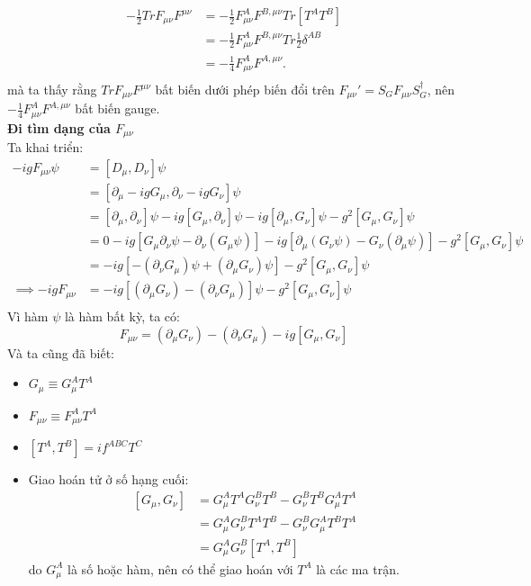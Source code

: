 \documentclass[14Pt]{report}
\begin{document}
	\begin{equation}
		\begin{split}
			-\frac{1}{2}TrF_{\mu\nu}F^{\mu\nu}	
			&=-\frac{1}{2}F_{\mu\nu}^AF^{B,\mu\nu}Tr\left[T^AT^B\right]\\
			&=-\frac{1}{2}F_{\mu\nu}^AF^{B,\mu\nu}Tr\frac{1}{2}\delta^{AB}\\
			&=-\frac{1}{4}F_{\mu\nu}^AF^{A,\mu\nu}.\\
		\end{split}
	\end{equation}
	mà ta thấy rằng $TrF_{\mu\nu}F^{\mu\nu}$ bất biến dưới phép biến đổi trên $F_{\mu\nu}'=S_GF_{\mu\nu}S_G^\dagger$, nên $-\frac{1}{4}F_{\mu\nu}^AF^{A,\mu\nu}$ bất biến gauge.\\
	\textbf{Đi tìm dạng của $F_{\mu\nu}$}\\
	Ta khai triển:
	\begin{equation}
		\begin{split}
			-igF_{\mu\nu}\psi&=\left[D_\mu,D_\nu\right]\psi\\
			&=\left[\partial_\mu-igG_\mu,\partial_\nu-igG_\nu\right]\psi\\
			&=\left[\partial_\mu,\partial_\nu\right]\psi-ig\left[G_\mu,\partial_\nu\right]\psi-ig\left[\partial_\mu,G_\nu\right]\psi-g^2\left[G_\mu,G_\nu\right]\psi\\
			&=0-ig\left[G_\mu\partial_\nu\psi-\partial_\nu(G_\mu\psi)\right]-ig\left[\partial_\mu(G_\nu\psi)-G_\nu(\partial_\mu\psi)\right]-g^2\left[G_\mu,G_\nu\right]\psi\\
			&=-ig\left[-(\partial_\nu G_\mu)\psi+(\partial_\mu G_\nu)\psi\right]-g^2\left[G_\mu,G_\nu\right]\psi\\
			\implies -igF_{\mu\nu}&=-ig\left[(\partial_\mu G_\nu)-(\partial_\nu G_\mu)\right]\psi-g^2\left[G_\mu,G_\nu\right]\psi\\
		\end{split}
	\end{equation}
	Vì hàm $\psi$ là hàm bất kỳ, ta có: 
	$$F_{\mu\nu}=(\partial_\mu G_\nu)-(\partial_\nu G_\mu)-ig\left[G_\mu,G_\nu\right]$$
	Và ta cũng đã biết:
	\begin{itemize}
		\item $G_\mu \equiv G_\mu^AT^A$
		\item $F_{\mu\nu} \equiv F_{\mu\nu}^AT^A$
		\item $\left[T^A,T^B\right]=if^{ABC}T^C$
		\item Giao hoán tử ở số hạng cuối:
		\begin{equation}
			\begin{split}
				\left[G_\mu,G_\nu\right]
				&=	G_\mu^AT^AG_\nu^BT^B-G_\nu^BT^B	G_\mu^AT^A\\
				&=G_\mu^AG_\nu^BT^AT^B-G_\nu^BG_\mu^AT^BT^A\\
				&=G_\mu^AG_\nu^B\left[T^A,T^B\right]
			\end{split}
		\end{equation}
		do $G_\mu^A$ là số hoặc hàm, nên có thể giao hoán với $T^A$ là các ma trận.
	\end{itemize}
\end{document}
